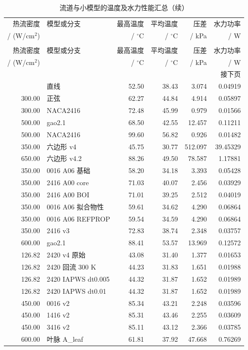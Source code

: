 \documentclass[stage2,fontset=fandol]{ydzjreport}
\begin{document}
\clearpage
\setcounter{table}{5}
\begin{longtable}{@{}r p{} r r r r@{}}
\caption{流道与小模型的温度及水力性能汇总（按数据来源与工况分组）}
\label{tab:results}\\
\toprule
\rowcolor{ydzjlight} 热流密度 & 模型或分支 & 最高温度 & 平均温度 & 压差 & 水力功率 \\
/ (W/cm$^2$) & & / $^\circ$C & / $^\circ$C & / kPa & / W \\
\midrule
\endfirsthead
\caption[]{流道与小模型的温度及水力性能汇总（续）}\\
\toprule
\rowcolor{ydzjlight} 热流密度 & 模型或分支 & 最高温度 & 平均温度 & 压差 & 水力功率 \\
/ (W/cm$^2$) & & / $^\circ$C & / $^\circ$C & / kPa & / W \\
\midrule
\endhead
\midrule
\multicolumn{6}{r}{\small 接下页}\\
\endfoot
\bottomrule
\endlastfoot
300.00 & 直线 & 52.50 & 38.43 & 3.074 & 0.04919 \\
300.00 & 正弦 & 62.27 & 44.84 & 4.914 & 0.05897 \\
300.00 & NACA2416 & 72.48 & 45.99 & 0.979 & 0.01566 \\
500.00 & gao2.1 & 68.50 & 42.55 & 12.457 & 0.11211 \\
500.00 & NACA2416 & 99.60 & 56.82 & 0.926 & 0.01482 \\
350.00 & 六边形 v4 & 45.75 & 30.77 & 512.097 & 39.45329 \\
650.00 & 六边形 v4.2 & 88.26 & 49.50 & 78.587 & 1.17881 \\
350.00 & 0016 A06 基础 & 58.20 & 34.18 & 3.393 & 0.05428 \\
350.00 & 2416 A00 core & 71.03 & 40.07 & 2.456 & 0.03929 \\
350.00 & 2416 A00 BOI & 71.01 & 39.25 & 2.512 & 0.04019 \\
350.00 & 0016 A06 拟合物性 & 59.61 & 34.62 & 4.290 & 0.06864 \\
350.00 & 0016 A06 REFPROP & 59.54 & 34.59 & 4.290 & 0.06864 \\
350.00 & 2416 v3 & 72.83 & 38.74 & 2.348 & 0.03757 \\
600.00 & gao2.1 & 88.41 & 53.57 & 13.969 & 0.12572 \\
126.82 & 2420 v4 原始 & 43.08 & 31.40 & 1.377 & 0.01653 \\
126.82 & 2420 回流 300 K & 44.23 & 31.83 & 1.651 & 0.01988 \\
126.82 & 2420 IAPWS dt0.005 & 44.32 & 31.87 & 1.652 & 0.01989 \\
126.82 & 2420 IAPWS dt0.01 & 44.32 & 31.87 & 1.652 & 0.01989 \\
450.00 & 0016 v2 & 85.34 & 43.21 & 2.248 & 0.03596 \\
450.00 & 1416 v2 & 85.31 & 43.46 & 2.255 & 0.03609 \\
450.00 & 3416 v2 & 85.11 & 43.12 & 2.366 & 0.03785 \\
600.00 & 叶脉 A\_leaf & 61.81 & 37.92 & 47.668 & 0.76269 \\
\end{longtable}
\end{document}
